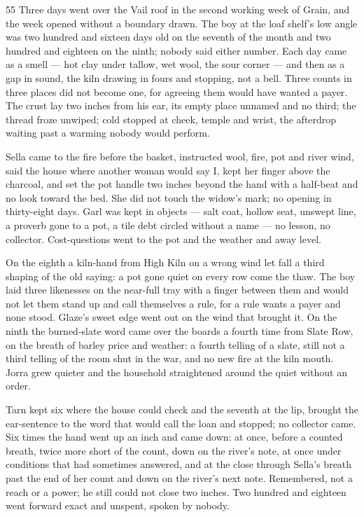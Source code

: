 \begin{CRchronicle}{55}
Three days went over the Vail roof in the second working week of Grain, and the week opened without a boundary drawn. The boy at the loaf shelf’s low angle was two hundred and sixteen days old on the seventh of the month and two hundred and eighteen on the ninth; nobody said either number. Each day came as a smell --- hot clay under tallow, wet wool, the sour corner --- and then as a gap in sound, the kiln drawing in fours and stopping, not a bell. Three counts in three places did not become one, for agreeing them would have wanted a payer. The crust lay two inches from his ear, its empty place unnamed and no third; the thread froze unwiped; cold stopped at cheek, temple and wrist, the afterdrop waiting past a warming nobody would perform.

Sella came to the fire before the basket, instructed wool, fire, pot and river wind, said the house where another woman would say I, kept her finger above the charcoal, and set the pot handle two inches beyond the hand with a half-beat and no look toward the bed. She did not touch the widow’s mark; no opening in thirty-eight days. Garl was kept in objects --- salt coat, hollow seat, unswept line, a proverb gone to a pot, a tile debt circled without a name --- no lesson, no collector. Cost-questions went to the pot and the weather and away level.

On the eighth a kiln-hand from High Kiln on a wrong wind let fall a third shaping of the old saying: a pot gone quiet on every row come the thaw. The boy laid three likenesses on the near-full tray with a finger between them and would not let them stand up and call themselves a rule, for a rule wants a payer and none stood. Glaze’s sweet edge went out on the wind that brought it. On the ninth the burned-slate word came over the boards a fourth time from Slate Row, on the breath of barley price and weather: a fourth telling of a slate, still not a third telling of the room shut in the war, and no new fire at the kiln mouth. Jorra grew quieter and the household straightened around the quiet without an order.

Tarn kept six where the house could check and the seventh at the lip, brought the ear-sentence to the word that would call the loan and stopped; no collector came. Six times the hand went up an inch and came down: at once, before a counted breath, twice more short of the count, down on the river’s note, at once under conditions that had sometimes answered, and at the close through Sella’s breath past the end of her count and down on the river’s next note. Remembered, not a reach or a power; he still could not close two inches. Two hundred and eighteen went forward exact and unspent, spoken by nobody.
\end{CRchronicle}
